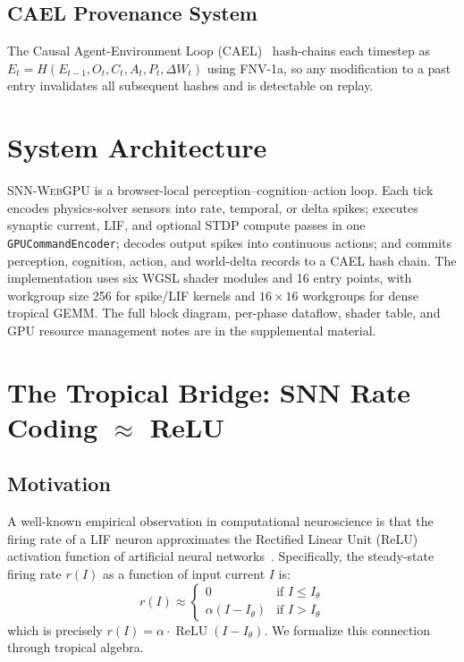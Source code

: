 \documentclass[10pt]{article}
\newcommand{\snnwebgpu}{\textsc{SNN-WebGPU}}
\newcommand{\cael}{\textsc{CAEL}}
\newcommand{\relu}{\operatorname{ReLU}}
\begin{document}
\subsection{CAEL Provenance System}

The Causal Agent-Environment Loop (\cael{})~\cite{holoscript2026cael} hash-chains each timestep as $E_t = H(E_{t-1}, O_t, C_t, A_t, P_t, \Delta W_t)$ using FNV-1a, so any modification to a past entry invalidates all subsequent hashes and is detectable on replay.

\section{System Architecture}
\label{sec:architecture}

\snnwebgpu{} is a browser-local perception--cognition--action loop.
Each tick encodes physics-solver sensors into rate, temporal, or delta spikes;
executes synaptic current, LIF, and optional STDP compute passes in one
\texttt{GPUCommandEncoder}; decodes output spikes into continuous actions; and
commits perception, cognition, action, and world-delta records to a \cael{}
hash chain.
The implementation uses six WGSL shader modules and 16 entry points, with
workgroup size 256 for spike/LIF kernels and $16\times16$ workgroups for dense
tropical GEMM.
The full block diagram, per-phase dataflow, shader table, and GPU resource
management notes are in the supplemental material.

\section{The Tropical Bridge: SNN Rate Coding $\approx$ ReLU}
\label{sec:tropical}

\subsection{Motivation}

A well-known empirical observation in computational neuroscience is that the
firing rate of a LIF neuron approximates the Rectified Linear Unit (ReLU)
activation function of artificial neural networks~\cite{glorot2011deep}.
Specifically, the steady-state firing rate $r(I)$ as a function of input
current $I$ is:
\begin{equation}
r(I) \approx \begin{cases}
0 & \text{if } I \leq I_\theta \\
\alpha (I - I_\theta) & \text{if } I > I_\theta
\end{cases}
\end{equation}
which is precisely $r(I) = \alpha \cdot \relu(I - I_\theta)$.
We formalize this connection through tropical algebra.
\end{document}
